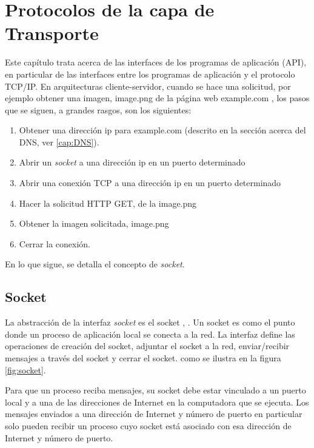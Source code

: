 
\setchapterpreamble[u]{\margintoc}

\chapter{Protocolos de la capa de Transporte }
\label{ch:Potocolos capa de Transporte}

Este capítulo trata acerca de las interfaces de los programas de aplicación (API), en particular de las interfaces entre los programas de aplicación y el protocolo TCP/IP.  
En arquitecturas cliente-servidor, cuando se hace una solicitud, por ejemplo obtener una imagen, image.png de la página web example.com ,  los pasos que se siguen, a grandes rasgos, son los siguientes:

\begin{enumerate}
	\item Obtener una dirección ip para example.com (descrito en la sección acerca del DNS, ver \ref{cap:DNS}).
	\item Abrir un \textit{socket} a una dirección ip en un puerto determinado
	\item Abrir una conexión TCP a una dirección ip en un puerto determinado
	\item Hacer la solicitud HTTP GET, de la image.png
	\item Obtener la imagen solicitada, image.png
	\item Cerrar la conexión.
\end{enumerate}
En lo que sigue, se detalla el concepto de  \textit{socket}.

\section{Socket} 

La abstracción de la interfaz \textit{socket} es el socket , . Un socket es como el punto donde un proceso de aplicación local se conecta a la red. La interfaz define las operaciones de creación del socket, adjuntar el socket a la red, enviar/recibir mensajes a través del socket y cerrar el socket.  como se ilustra en la figura \ref{fig:socket}.
 
Para que un proceso reciba mensajes, su socket debe estar vinculado a un puerto local y a una de las direcciones de Internet en la computadora  que se ejecuta. 
Los mensajes enviados a una dirección de Internet y número de puerto en particular solo pueden recibir un proceso cuyo socket está asociado con esa dirección de Internet y número de puerto.

